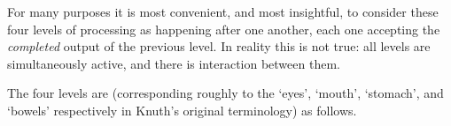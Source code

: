 \documentclass[letterpaper]{book}
\begin{document}
For many purposes it is most convenient, and most insightful,
to consider these four levels of processing as happening
after one another, each one accepting the {\em completed\/}
output of the previous level. In reality this is not true:
all levels are simultaneously
active, and there is interaction between them.

The four levels are (corresponding roughly
to the `eyes', `mouth', `stomach', and `bowels' respectively
in Knuth's original terminology) as follows.
\end{document}
